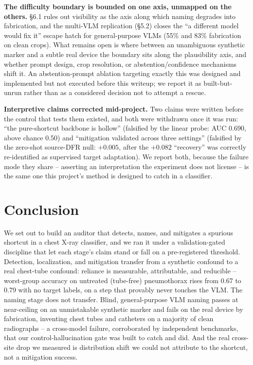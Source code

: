 \documentclass{ieeeaccess}
\begin{document}
\textbf{The difficulty boundary is bounded on one axis, unmapped on the
others.} \S6.1 rules out visibility as the axis along which naming degrades
into fabrication, and the multi-VLM replication (\S5.2) closes the ``a
different model would fix it'' escape hatch for general-purpose VLMs (55\%
and 83\% fabrication on clean crops). What remains open is where between an
unambiguous synthetic marker and a subtle real device the boundary sits
along the plausibility axis, and whether prompt design, crop resolution, or
abstention/confidence mechanisms shift it. An abstention-prompt ablation
targeting exactly this was designed and implemented but not executed before
this writeup; we report it as built-but-unrun rather than as a considered
decision not to attempt a rescue.

\textbf{Interpretive claims corrected mid-project.} Two claims were written
before the control that tests them existed, and both were withdrawn once it
was run: ``the pure-shortcut backbone is hollow'' (falsified by the linear
probe: AUC 0.690, above chance 0.50) and ``mitigation validated across three
settings'' (falsified by the zero-shot source-DFR null: $+0.005$, after the
$+0.082$ ``recovery'' was correctly re-identified as supervised target
adaptation). We report both, because the failure mode they share --
asserting an interpretation the experiment does not license -- is the same
one this project's method is designed to catch in a classifier.

\section{Conclusion}
\label{sec:conclusion}
We set out to build an auditor that detects, names, and mitigates a spurious
shortcut in a chest X-ray classifier, and we ran it under a validation-gated
discipline that let each stage's claim stand or fall on a pre-registered
threshold. Detection, localization, and mitigation transfer from a
synthetic confound to a real chest-tube confound: reliance is measurable,
attributable, and reducible -- worst-group accuracy on untreated (tube-free)
pneumothorax rises from 0.67 to 0.79 with no target labels, on a step that
provably never touches the VLM. The naming stage does not transfer. Blind,
general-purpose VLM naming passes at near-ceiling on an unmistakable
synthetic marker and fails on the real device by fabrication, inventing
chest tubes and catheters on a majority of clean radiographs -- a cross-model
failure, corroborated by independent benchmarks, that our control-hallucination
gate was built to catch and did. And the real cross-site drop we measured
is distribution shift we could not attribute to the shortcut, not a
mitigation success.
\end{document}
